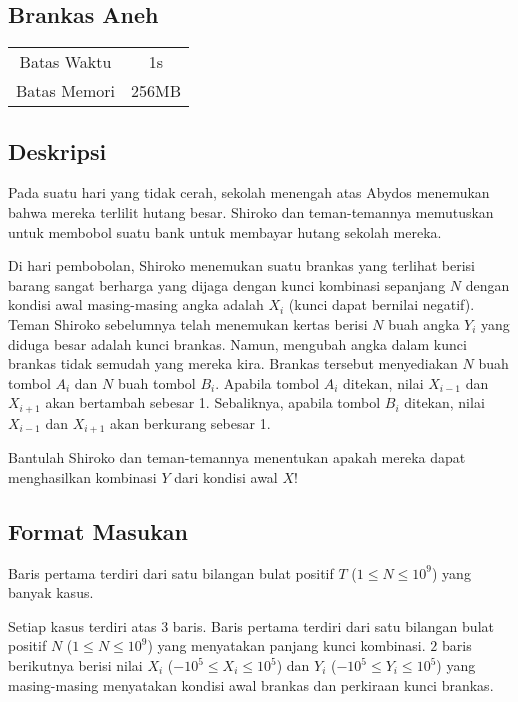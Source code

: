 \documentclass{article}
\begin{document}
\begin{center}

    
    \section*{Brankas Aneh} %

    \begin{tabular}{ | c c | }
        \hline
        Batas Waktu  & 1s \\    %
        Batas Memori & 256MB \\  %
        \hline
    \end{tabular}
\end{center}

\subsection*{Deskripsi}

Pada suatu hari yang tidak cerah, sekolah menengah atas Abydos menemukan bahwa mereka terlilit hutang besar. Shiroko dan teman-temannya memutuskan untuk membobol suatu bank untuk membayar hutang sekolah mereka.

Di hari pembobolan, Shiroko menemukan suatu brankas yang terlihat berisi barang sangat berharga yang dijaga dengan kunci kombinasi sepanjang $N$ dengan kondisi awal masing-masing angka adalah $X_i$ (kunci dapat bernilai negatif). Teman Shiroko sebelumnya telah menemukan kertas berisi $N$ buah angka $Y_i$ yang diduga besar adalah kunci brankas. Namun, mengubah angka dalam kunci brankas tidak semudah yang mereka kira. Brankas tersebut menyediakan $N$ buah tombol $A_i$ dan $N$ buah tombol $B_i$. Apabila tombol $A_i$ ditekan, nilai $X_{i-1}$ dan $X_{i+1}$ akan bertambah sebesar 1. Sebaliknya, apabila tombol $B_i$ ditekan, nilai $X_{i-1}$ dan $X_{i+1}$ akan berkurang sebesar 1.

Bantulah Shiroko dan teman-temannya menentukan apakah mereka dapat menghasilkan kombinasi $Y$ dari kondisi awal $X$!

\subsection*{Format Masukan}

Baris pertama terdiri dari satu bilangan bulat positif $T$ ($1 \leq N \leq 10^{9}$)  yang banyak kasus.

Setiap kasus terdiri atas 3 baris. Baris pertama terdiri dari satu bilangan bulat positif $N$ ($1 \leq N \leq 10^{9}$)  yang menyatakan panjang kunci kombinasi. 
$2$ baris berikutnya berisi nilai $X_i$ ($-10^{5} \leq X_i \leq 10^{5}$) dan $Y_i$ ($-10^{5} \leq Y_i \leq 10^{5}$) yang masing-masing menyatakan kondisi awal brankas dan perkiraan kunci brankas.
\end{document}
